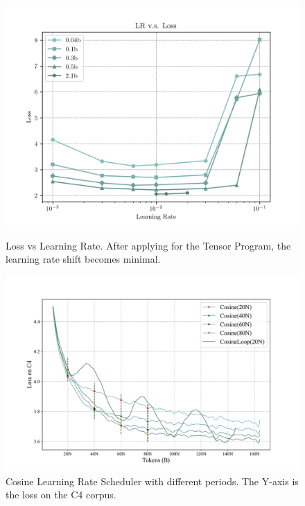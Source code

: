 \vspace{-3mm}
\begin{figure}[htbp]
    \centering
    \begin{minipage}{0.46\linewidth}
        \centering
        \includegraphics[width=0.9\linewidth]{Fig/loss_vs_lr.png}
        \caption{Loss vs Learning Rate. After applying for the Tensor Program, the learning rate shift becomes minimal.}
        \label{fig:loss_vs_lr}
    \end{minipage}
    \hfill %
    \begin{minipage}{0.46\linewidth}
        \centering
        \includegraphics[width=1.0\linewidth]{Fig/cosine_2024-03-26_15-36-16.pdf}
        \caption{Cosine Learning Rate Scheduler with different periods. The Y-axis is the loss on the C4 corpus.}
        \label{fig:cosine_lr}
        \vspace{0.47cm}
    \end{minipage}
\end{figure}
\vspace{-5mm}
